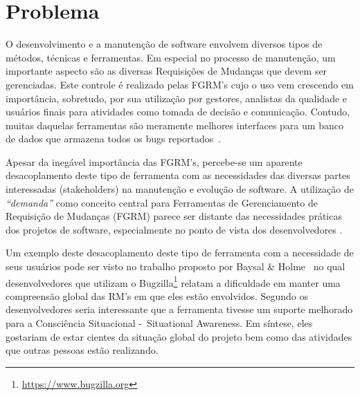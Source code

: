 %


\section{Problema}
\label{sec:intro-problema}


O desenvolvimento e a manutenção de software envolvem diversos tipos de métodos,
técnicas e ferramentas. Em especial no processo de manutenção, um importante
aspecto são as diversas Requisições de Mudanças que devem ser gerenciadas. Este
controle é realizado pelas FGRM's cujo o uso vem crescendo em importância,
sobretudo, por sua utilização por gestores, analistas da qualidade e usuários
finais para atividades como tomada de decisão e comunicação. Contudo, muitas
daquelas ferramentas são meramente melhores interfaces para um banco de dados
que armazena todos os bugs reportados~\cite{zimmermann2009improving}.

Apesar da inegável importância das FGRM's, percebe-se um aparente desacoplamento
deste tipo de ferramenta com as necessidades das diversas partes interessadas
(stakeholders) na manutenção e evolução de software. A utilização de
\textit{``demanda''} como conceito central para Ferramentas de Gerenciamento de
Requisição de Mudanças (FGRM) parece ser distante das necessidades práticas dos
projetos de software, especialmente no ponto de vista dos desenvolvedores
\cite{Baysal:2013:SAP:2486788.2486957}.

Um exemplo deste desacoplamento deste tipo de ferramenta com a necessidade de
seus usuários pode ser visto no trabalho proposto por Baysal \&
Holme~\cite{baysal2012qualitative} no qual desenvolvedores que utilizam o
Bugzilla\footnote{\url{https://www.bugzilla.org}} relatam a dificuldade em
manter uma compreensão global das RM's em que eles estão envolvidos. Segundo os
desenvolvedores seria interessante que a ferramenta tivesse um suporte melhorado
para a Consciência Situacional -~Situational Awareness. Em síntese, eles
gostariam de estar cientes da situação global do projeto bem como das atividades
que outras pessoas estão realizando.

